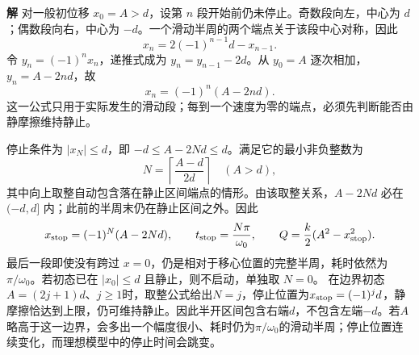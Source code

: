 \documentclass[11pt,openany,fontset=fandol]{ctexbook}
\theoremstyle{definition}\newtheorem{example}{例}[chapter]\newtheorem{exercise}{习题}[chapter]
\newcommand{\SolutionStart}{\par\medskip\ifdim\pagetotal>0pt\ifdim\dimexpr\pagegoal-\pagetotal\relax<3\baselineskip\newpage\fi\fi\noindent\textbf{解}\quad\ignorespaces}
\newenvironment{solution}{\SolutionStart}{\par\medskip}
\begin{document}
\begin{solution}
对一般初位移 $x_0=A>d$，设第 $n$ 段开始前仍未停止。奇数段向左，中心为 $d$；偶数段向右，中心为 $-d$。一个滑动半周的两个端点关于该段中心对称，因此
\[
x_n=2(-1)^{n-1}d-x_{n-1}.
\]
令 $y_n=(-1)^nx_n$，递推式成为 $y_n=y_{n-1}-2d$。从 $y_0=A$ 逐次相加，$y_n=A-2nd$，故
\[
x_n=(-1)^n(A-2nd).
\]
这一公式只用于实际发生的滑动段；每到一个速度为零的端点，必须先判断能否由静摩擦维持静止。

停止条件为 $|x_N|\le d$，即 $-d\le A-2Nd\le d$。满足它的最小非负整数为
\[
N=\left\lceil\frac{A-d}{2d}\right\rceil\quad(A>d),
\]
其中向上取整自动包含落在静止区间端点的情形。由该取整关系，$A-2Nd$ 必在 $(-d,d]$ 内；此前的半周末仍在静止区间之外。因此
\[
x_{\rm stop}=(-1)^N(A-2Nd),\qquad
t_{\rm stop}=\frac{N\pi}{\omega_0},\qquad
Q=\frac k2(A^2-x_{\rm stop}^2).
\]
最后一段即使没有跨过 $x=0$，仍是相对于移心位置的完整半周，耗时依然为 $\pi/\omega_0$。若初态已在 $|x_0|\le d$ 且静止，则不启动，单独取 $N=0$。
在边界初态$A=(2j+1)d$、$j\ge1$时，取整公式给出$N=j$，停止位置为$x_{\rm stop}=(-1)^jd$，静摩擦恰达到上限，仍可维持静止。因此半开区间包含右端$d$，不包含左端$-d$。若$A$略高于这一边界，会多出一个幅度很小、耗时仍为$\pi/\omega_0$的滑动半周；停止位置连续变化，而理想模型中的停止时间会跳变。
\end{solution}
\end{document}
